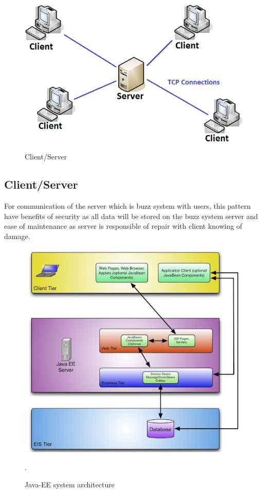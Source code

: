 \begin{figure}[H]	
\graphicspath{ {images/} }
    	\includegraphics[scale=0.5]{csp.png}
    	\caption{Client/Server}
	\end{figure}
	
\subsection*{Client/Server} 
For communication of the server which is buzz system with users, this pattern have benefits of security as all data will be stored on the buzz system server and ease of maintenance as server is responsible of repair with client knowing of damage.

\begin{figure}[H]
	\includegraphics[scale=0.5]{MVC.jpg}
   	\caption{Java-EE system architecture}.
\end{figure}
